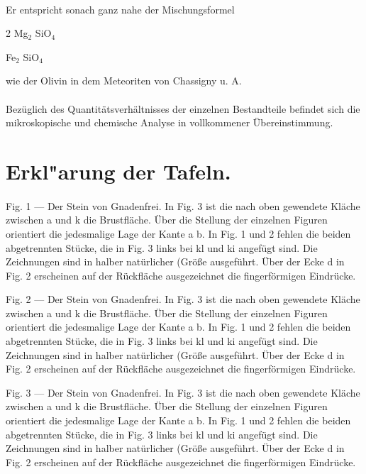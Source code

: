 \documentclass[a4paper, 11pt, oneside]{article}
\begin{document}
\paragraph{}
Er entspricht sonach ganz nahe der Mischungsformel
\begin{center}
2 Mg$_{2}$ SiO$_{4}$
\end{center}
\begin{center}
Fe$_{2}$ SiO$_{4}$
\end{center}
wie der Olivin in dem Meteoriten von Chassigny u. A.
\paragraph{}
Bezüglich des Quantitätsverhältnisses der einzelnen Bestandteile befindet sich die mikroskopische und chemische Analyse in vollkommener Übereinstimmung.
\clearpage
\section{Erkl"arung der Tafeln.}
\paragraph{}
Fig. 1 --- Der Stein von Gnadenfrei. In Fig. 3 ist die nach oben gewendete Kläche zwischen a und k die Brustfläche. Über die Stellung der einzelnen Figuren orientiert die jedesmalige Lage der Kante a b. In Fig. 1 und 2 fehlen die beiden abgetrennten Stücke, die in Fig. 3 links bei kl und ki angefügt sind. Die Zeichnungen sind in halber natürlicher (Größe ausgeführt. Über der Ecke d in Fig. 2 erscheinen auf der Rückfläche ausgezeichnet die fingerförmigen Eindrücke.

Fig. 2 --- Der Stein von Gnadenfrei. In Fig. 3 ist die nach oben gewendete Kläche zwischen a und k die Brustfläche. Über die Stellung der einzelnen Figuren orientiert die jedesmalige Lage der Kante a b. In Fig. 1 und 2 fehlen die beiden abgetrennten Stücke, die in Fig. 3 links bei kl und ki angefügt sind. Die Zeichnungen sind in halber natürlicher (Größe ausgeführt. Über der Ecke d in Fig. 2 erscheinen auf der Rückfläche ausgezeichnet die fingerförmigen Eindrücke.

Fig. 3 --- Der Stein von Gnadenfrei. In Fig. 3 ist die nach oben gewendete Kläche zwischen a und k die Brustfläche. Über die Stellung der einzelnen Figuren orientiert die jedesmalige Lage der Kante a b. In Fig. 1 und 2 fehlen die beiden abgetrennten Stücke, die in Fig. 3 links bei kl und ki angefügt sind. Die Zeichnungen sind in halber natürlicher (Größe ausgeführt. Über der Ecke d in Fig. 2 erscheinen auf der Rückfläche ausgezeichnet die fingerförmigen Eindrücke.
\end{document}
